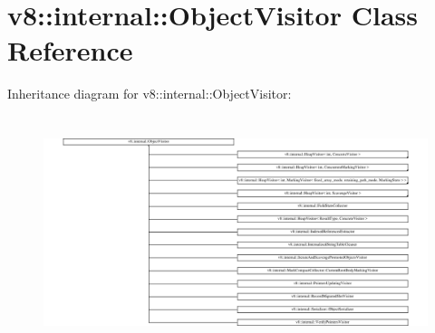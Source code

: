 \hypertarget{classv8_1_1internal_1_1ObjectVisitor}{}\section{v8\+:\+:internal\+:\+:Object\+Visitor Class Reference}
\label{classv8_1_1internal_1_1ObjectVisitor}
Inheritance diagram for v8\+:\+:internal\+:\+:Object\+Visitor\+:\begin{figure}[H]
\begin{center}
\leavevmode
\includegraphics[height=6.807131cm]{classv8_1_1internal_1_1ObjectVisitor}
\end{center}
\end{figure}
